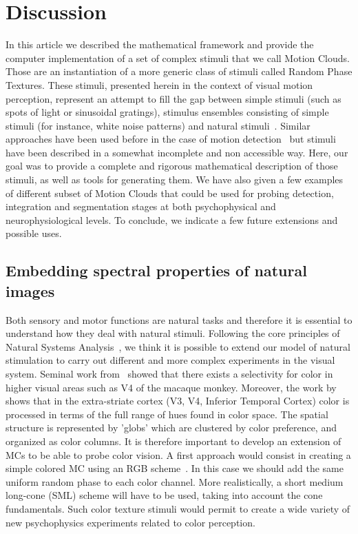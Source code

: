 \documentclass[a4paper,11pt]{article}%
\begin{document}
\section{Discussion}\label{section:future}

In this article we described the mathematical framework and provide the computer implementation of a set of complex stimuli that we call Motion Clouds. Those  are an instantiation of a more generic class of stimuli called Random Phase Textures.  These stimuli, presented herein in the context of visual motion perception, represent an attempt to fill the gap between simple stimuli (such as spots of light or sinusoidal gratings), stimulus ensembles consisting of simple stimuli (for instance, white noise patterns) and natural stimuli~\citep{Felsen05,Rust05}. Similar approaches have been  used before in the case of motion detection~\citep{Schrater00} but stimuli have been described in a somewhat incomplete and non accessible way. Here, our goal was to provide a complete and rigorous  mathematical description of those stimuli, as well as tools for generating them. We have also given a few examples of different subset of Motion Clouds that could be used for probing detection, integration and segmentation stages at both psychophysical and neurophysiological levels. To conclude, we indicate a few future extensions and possible uses. %
%
\subsection{Embedding spectral properties of natural images}
Both sensory and motor functions are natural tasks and therefore it is essential to understand how they deal with natural stimuli. Following the core principles of Natural Systems Analysis~\citep{Geisler09}, we think it is possible to extend our model of natural stimulation to carry out different and more complex experiments in the visual system. Seminal work from~\citep{Zeki83} showed that there exists a selectivity for color in higher visual areas such as V4 of the macaque monkey. Moreover,  the work by~\citep{Conway07}  shows that in the extra-striate cortex (V3, V4, Inferior Temporal Cortex) color is processed in terms of the full range of hues found in color space. The spatial structure is represented by  'globs' which are clustered by color preference, and organized as color columns. It is therefore important to develop an extension of MCs to be able to probe color vision. A first approach would consist in  creating a simple colored MC using an RGB scheme~\citep{Galerne10}. In this case we should add the same uniform random phase to each color channel. More realistically, a short medium long-cone (SML) scheme will have to be used, taking into account the cone fundamentals. Such color texture stimuli would permit to create a wide variety of new psychophysics experiments related to color perception. %
%
\end{document}
